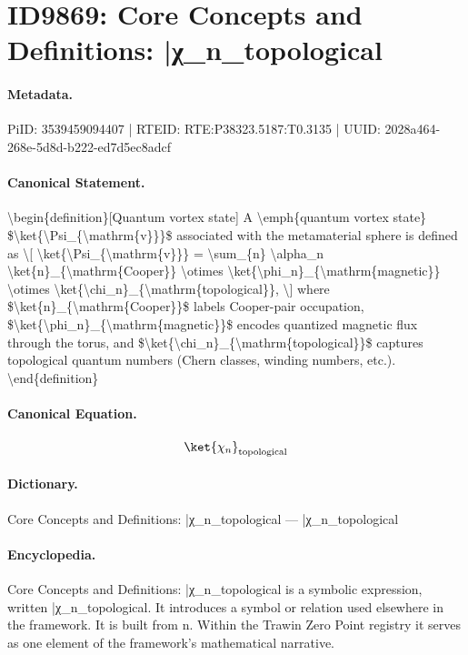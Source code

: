 \section*{ID9869: Core Concepts and Definitions: |χ\_n\_topological}
\paragraph{Metadata.}
PiID: 3539459094407 | RTEID: RTE:P38323.5187:T0.3135 | UUID: 2028a464-268e-5d8d-b222-ed7d5ec8adcf

\paragraph{Canonical Statement.}
\textbackslash{}begin\{definition\}[Quantum vortex state] A \textbackslash{}emph\{quantum vortex state\} \$\textbackslash{}ket\{\textbackslash{}Psi\_\{\textbackslash{}mathrm\{v\}\}\}\$ associated with the metamaterial sphere is defined as \textbackslash{}[ \textbackslash{}ket\{\textbackslash{}Psi\_\{\textbackslash{}mathrm\{v\}\}\} = \textbackslash{}sum\_\{n\} \textbackslash{}alpha\_n \textbackslash{}ket\{n\}\_\{\textbackslash{}mathrm\{Cooper\}\} \textbackslash{}otimes \textbackslash{}ket\{\textbackslash{}phi\_n\}\_\{\textbackslash{}mathrm\{magnetic\}\} \textbackslash{}otimes \textbackslash{}ket\{\textbackslash{}chi\_n\}\_\{\textbackslash{}mathrm\{topological\}\}, \textbackslash{}] where \$\textbackslash{}ket\{n\}\_\{\textbackslash{}mathrm\{Cooper\}\}\$ labels Cooper-pair occupation, \$\textbackslash{}ket\{\textbackslash{}phi\_n\}\_\{\textbackslash{}mathrm\{magnetic\}\}\$ encodes quantized magnetic flux through the torus, and \$\textbackslash{}ket\{\textbackslash{}chi\_n\}\_\{\textbackslash{}mathrm\{topological\}\}\$ captures topological quantum numbers (Chern classes, winding numbers, etc.). \textbackslash{}end\{definition\}

\paragraph{Canonical Equation.}
\[
\ket{\chi_n}_{\mathrm{topological}}
\]

\paragraph{Dictionary.}
Core Concepts and Definitions: |χ\_n\_topological — |χ\_n\_topological

\paragraph{Encyclopedia.}
Core Concepts and Definitions: |χ\_n\_topological is a symbolic expression, written |χ\_n\_topological. It introduces a symbol or relation used elsewhere in the framework. It is built from n. Within the Trawin Zero Point registry it serves as one element of the framework's mathematical narrative.
